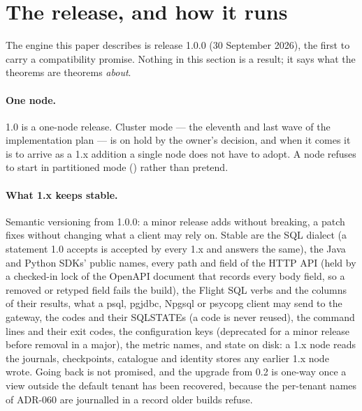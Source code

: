 \documentclass[11pt,a4paper]{article}
\renewcommand{\_}{\oldunderscore\allowbreak}
\newcommand{\code}[1]{\texttt{\pvbreakable{#1}}}
\begin{document}
\section{The release, and how it runs}\label{sec:release}

The engine this paper describes is release 1.0.0 (30 September 2026), the first to carry a compatibility
promise. Nothing in this section is a result; it says what the theorems are theorems \emph{about}.

\paragraph{One node.} 1.0 is a one-node release. Cluster mode --- the eleventh and last wave of the
implementation plan --- is on hold by the owner's decision, and when it comes it is to arrive as a 1.x
addition a single node does not have to adopt. A node refuses to start in partitioned mode
(\code{PRV-9002}) rather than pretend.

\paragraph{What 1.x keeps stable.} Semantic versioning from 1.0.0: a minor release adds without
breaking, a patch fixes without changing what a client may rely on. Stable are the SQL dialect (a
statement 1.0 accepts is accepted by every 1.x and answers the same), the Java and Python SDKs' public
names, every path and field of the HTTP API (held by a checked-in lock of the OpenAPI document that
records every body field, so a removed or retyped field fails the build), the Flight SQL verbs and the
columns of their results, what a psql, pgjdbc, Npgsql or psycopg client may send to the gateway, the
\code{PRV-nnnn} codes and their SQLSTATEs (a code is never reused), the command lines and their exit
codes, the configuration keys (deprecated for a minor release before removal in a major), the metric
names, and state on disk: a 1.x node reads the journals, checkpoints, catalogue and identity stores any
earlier 1.x node wrote. Going back is not promised, and the upgrade from 0.2 is one-way once a view
outside the default tenant has been recovered, because the per-tenant names of ADR-060 are journalled in
a record older builds refuse.
\end{document}
